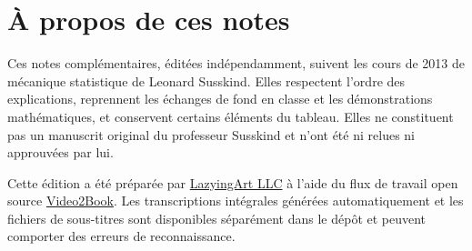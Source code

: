 \documentclass[11pt,oneside]{book}
\begin{document}
\frontmatter
\hypersetup{pageanchor=false}

\hypersetup{pageanchor=true}

\chapter*{À propos de ces notes}
Ces notes complémentaires, éditées indépendamment, suivent les cours de 2013 de mécanique statistique de Leonard Susskind. Elles respectent l’ordre des explications, reprennent les échanges de fond en classe et les démonstrations mathématiques, et conservent certains éléments du tableau. Elles ne constituent pas un manuscrit original du professeur Susskind et n’ont été ni relues ni approuvées par lui.

Cette édition a été préparée par \href{https://lazying.art}{LazyingArt LLC} à l’aide du flux de travail open source \href{https://github.com/lachlanchen/Video2Book}{Video2Book}. Les transcriptions intégrales générées automatiquement et les fichiers de sous-titres sont disponibles séparément dans le dépôt et peuvent comporter des erreurs de reconnaissance.
\clearpage
\tableofcontents
\mainmatter










\end{document}
